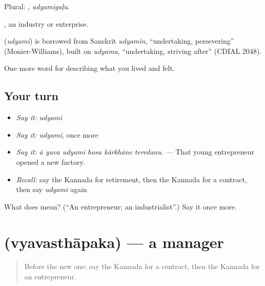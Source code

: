 Plural: , \emph{udyamigaḷu}.

, an industry or enterprise.

\begin{cousinweb}
\textbf{} (\emph{udyami}) is borrowed from Sanskrit \emph{udyamin}, \textquotedblleft{}undertaking, persevering\textquotedblright{} (Monier-Williams), built on \emph{udyama}, \textquotedblleft{}undertaking, striving after\textquotedblright{} (CDIAL 2048).
\end{cousinweb}

\begin{grammarlens}[title={What you've built}]
One more word for describing what you lived and felt.
\end{grammarlens}

\subsection*{Your turn}
\begin{itemize}
\raggedright
  \item \emph{Say it:} \emph{udyami}
  \item \emph{Say it:} \emph{udyami}, once more
  \item \emph{Say it:} \emph{ā yuva udyami hosa kārkhāne teredanu.} — That young entrepreneur opened a new factory.
  \item \emph{Recall:} say the Kannada for retirement, then the Kannada for a contract, then say \emph{udyami} again
\end{itemize}

\begin{tcolorbox}[breakable,colback=teal!4,colframe=teal!35!black,title={Before you move on}]
What does  mean? (\textquotedblleft{}An entrepreneur; an industrialist\textquotedblright{}.) Say it once more.
\end{tcolorbox}
\section[\texorpdfstring{\kn{ವ್ಯವಸ್ಥಾಪಕ} (vyavasthāpaka)}{ವ್ಯವಸ್ಥಾಪಕ (vyavasthāpaka)}]{ (vyavasthāpaka) — a manager}

\label{lesson:KA-C519-vyavasthapaka}



\begin{quote}
Before the new one: say the Kannada for a contract, then the Kannada for an entrepreneur.
\end{quote}

